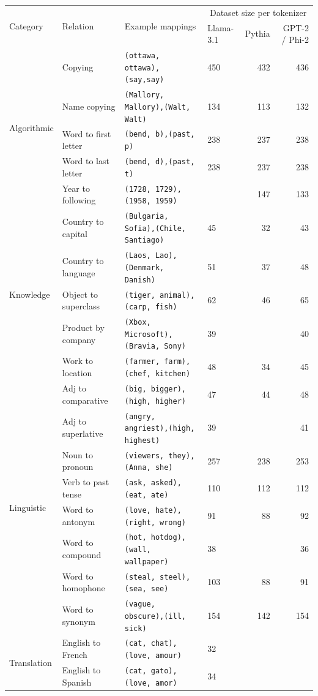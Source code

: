 \documentclass[11pt]{article}
\newcommand{\llama}{Llama-3.1}
\newcommand{\PHI}{Phi-2}
\newcommand{\Pythia}{Pythia}
\newcommand{\GPT}{GPT-2}
\begin{document}
\begin{table}[t]
\centering
\footnotesize
\setlength{\tabcolsep}{4.5pt}
\begin{tabular}{llllrr}
\toprule
\multirow{2}{*}{Category} & \multirow{2}{*}{Relation} & \multirow{2}{*}{Example mappings} & \multicolumn{3}{c}{Dataset size per tokenizer} \\
  & & & {\llama} & {\Pythia} & {\GPT} / {\PHI} \\
\midrule
\multirow{5}{*}{Algorithmic} & Copying & \texttt{(ottawa, ottawa),(say,say)} & 450 & 432 & 436 \\
& Name copying & \texttt{(Mallory, Mallory),(Walt, Walt)} & 134 & 113 & 132 \\
& Word to first letter & \texttt{(bend, b),(past, p)} & 238 & 237 & 238 \\
& Word to last letter & \texttt{(bend, d),(past, t)} & 238 & 237 & 238 \\
& Year to following & \texttt{(1728, 1729),(1958, 1959)} &  & 147 & 133 \\

\midrule
\multirow{5}{*}{Knowledge} & Country to capital & \texttt{(Bulgaria, Sofia),(Chile, Santiago)} & 45 & 32 & 43 \\
& Country to language & \texttt{(Laos, Lao),(Denmark, Danish)} & 51 & 37 & 48 \\
& Object to superclass & \texttt{(tiger, animal),(carp, fish)} & 62 & 46 & 65 \\
& Product by company & \texttt{(Xbox, Microsoft),(Bravia, Sony)} & 39 &  & 40 \\
& Work to location & \texttt{(farmer, farm),(chef, kitchen)} & 48 & 34 & 45 \\
  
\midrule
\multirow{8}{*}{Linguistic} &
Adj to comparative & \texttt{(big, bigger),(high, higher)} & 47 & 44 & 48 \\
& Adj to superlative & \texttt{(angry, angriest),(high, highest)} & 39 &  & 41 \\
& Noun to pronoun & \texttt{(viewers, they),(Anna, she)} & 257 & 238 & 253 \\
& Verb to past tense & \texttt{(ask, asked),(eat, ate)} & 110 & 112 & 112 \\
& Word to antonym & \texttt{(love, hate),(right, wrong)} & 91 & 88 & 92 \\
& Word to compound & \texttt{(hot, hotdog),(wall, wallpaper)} & 38 &  & 36 \\
& Word to homophone & \texttt{(steal, steel),(sea, see)} & 103 & 88 & 91 \\  
& Word to synonym & \texttt{(vague, obscure),(ill, sick)} & 154 & 142 & 154 \\
\midrule
\multirow{2}{*}{Translation}
 & English to French & \texttt{(cat, chat),(love, amour)} & 32 &  &  \\
& English to Spanish & \texttt{(cat, gato),(love, amor)} & 34 &  &  \\


\end{tabular}
\end{table}
\end{document}
